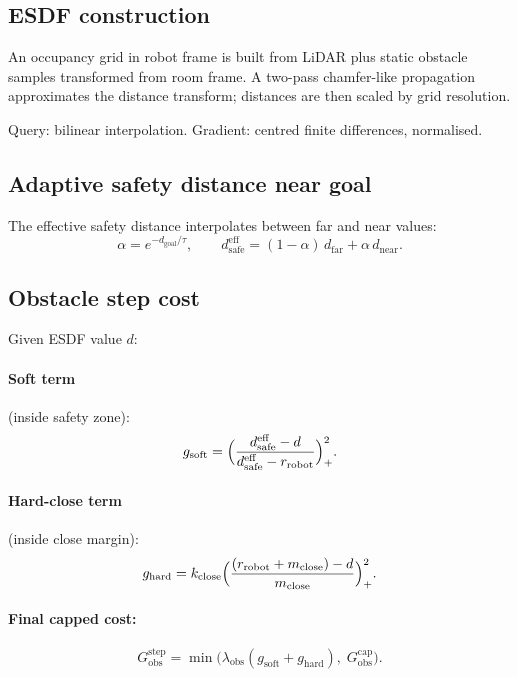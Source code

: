 \documentclass[a4paper, 11pt]{article}
\begin{document}
\subsection{ESDF construction}

An occupancy grid in robot frame is built from LiDAR plus static obstacle
samples transformed from room frame.
A two-pass chamfer-like propagation approximates the distance transform;
distances are then scaled by grid resolution.

Query: bilinear interpolation.
Gradient: centred finite differences, normalised.

\subsection{Adaptive safety distance near goal}

The effective safety distance interpolates between far and near values:
\begin{equation}\label{eq:dsafe}
  \alpha = e^{-d_{\text{goal}}/\tau},
  \qquad
  d_{\text{safe}}^{\text{eff}}
  = (1-\alpha)\,d_{\text{far}} + \alpha\,d_{\text{near}}.
\end{equation}

\subsection{Obstacle step cost}

Given ESDF value $d$:

\paragraph{Soft term} (inside safety zone):
\begin{equation}
  g_{\text{soft}}
  = \Bigl(\frac{d_{\text{safe}}^{\text{eff}} - d}
               {d_{\text{safe}}^{\text{eff}} - r_{\text{robot}}}\Bigr)^2_+.
\end{equation}

\paragraph{Hard-close term} (inside close margin):
\begin{equation}
  g_{\text{hard}}
  = k_{\text{close}}
    \Bigl(\frac{(r_{\text{robot}} + m_{\text{close}}) - d}
               {m_{\text{close}}}\Bigr)^2_+.
\end{equation}

\paragraph{Final capped cost:}
\begin{equation}
  G_{\text{obs}}^{\text{step}}
  = \min\bigl(
      \lambda_{\text{obs}}(g_{\text{soft}} + g_{\text{hard}}),\;
      G_{\text{obs}}^{\text{cap}}
    \bigr).
\end{equation}
\end{document}
